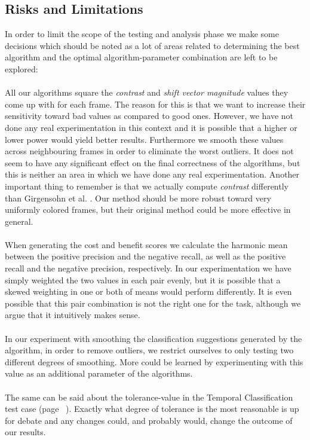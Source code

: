 \subsection{Risks and Limitations}
In order to limit the scope of the testing and analysis phase we make some decisions which should be noted as a lot of areas related to determining the best algorithm and the optimal algorithm-parameter combination are left to be explored:\\
\\
All our algorithms square the \textit{contrast} and \textit{shift vector magnitude} values they come up with for each frame. The reason for this is that we want to increase their sensitivity toward bad values as compared to good ones. However, we have not done any real experimentation in this context and it is possible that a higher or lower power would yield better results. Furthermore we smooth these values across neighbouring frames in order to eliminate the worst outliers. It does not seem to have any significant effect on the final correctness of the algorithms, but this is neither an area in which we have done any real experimentation. Another important thing to remember is that we actually compute \textit{contrast} differently than Girgensohn et al. \cite{Girgensohn:2000:SAH:354401.354415}. Our method should be more robust toward very uniformly colored frames, but their original method could be more effective in general.\\
\\
When generating the cost and benefit scores we calculate the harmonic mean between the positive precision and the negative recall, as well as the positive recall and the negative precision, respectively. In our experimentation we have simply weighted the two values in each pair evenly, but it is possible that a skewed weighting in one or both of means would perform differently. It is even possible that this pair combination is not the right one for the task, although we argue that it intuitively makes sense.\\
\\
In our experiment with smoothing the classification suggestions generated by the algorithm, in order to remove outliers, we restrict ourselves to only testing two different degrees of smoothing. More could be learned by experimenting with this value as an additional parameter of the algorithms.\\
\\
The same can be said about the tolerance-value in the Temporal Classification test case (page ~\pageref{sec:tctestcase}). Exactly what degree of tolerance is the most reasonable is up for debate and any changes could, and probably would, change the outcome of our results.\\
